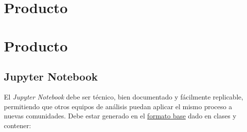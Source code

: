 \documentclass[a4,11pt]{aleph-notas}
\begin{document}
\section*{Producto}  

\section*{Producto}  

\subsection{Jupyter Notebook}  
El \textit{Jupyter Notebook} debe ser técnico, bien documentado y fácilmente replicable, permitiendo que otros equipos de análisis puedan aplicar el mismo proceso a nuevas comunidades. Debe estar generado en el \href{https://github.com/andres-merino/FormatoBaseProyectos/blob/main/Plantilla.ipynb}{formato base} dado en clases y contener:
\end{document}

